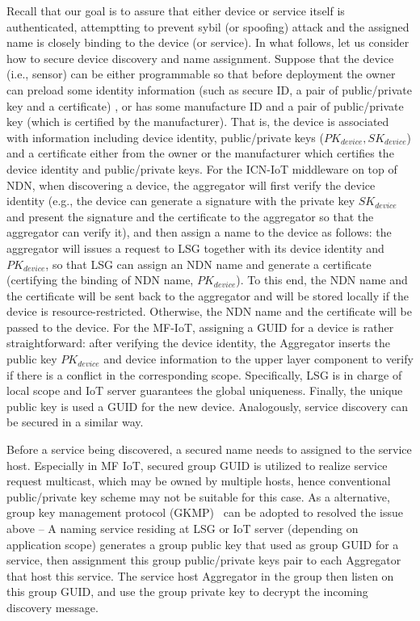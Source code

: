 Recall that our goal is to assure that either device or service itself is authenticated, attemptting to prevent sybil (or spoofing) attack \cite{sybil} and the assigned name is closely binding to the device (or service). In what follows, let us consider how to secure device discovery and name assignment. Suppose that the device (i.e., sensor) can be either programmable so that before deployment the owner can preload some identity information (such as secure ID, a pair of public/private key and a certificate) , or has some manufacture ID and a pair of public/private key (which is certified by the manufacturer). That is, the device is associated with information including device identity, public/private keys ($PK_{device}, SK_{device}$) and a certificate either from the owner or the manufacturer which certifies the device identity and public/private keys. For the ICN-IoT middleware on top of NDN, when discovering a device, the aggregator will first verify the device identity (e.g., the device can generate a signature with the private key $SK_{device}$ and present the signature and the certificate to the aggregator so that the aggregator can verify it), and then assign a name to the device as follows: the aggregator will issues a request to LSG together with its device identity and $PK_{device}$, so that LSG can assign an NDN name and generate a certificate (certifying the binding of NDN name, $PK_{device}$). To this end, the NDN name and the certificate will be sent back to the aggregator and will be stored locally if the device is resource-restricted. Otherwise, the NDN name and the certificate will be passed to the device. For the MF-IoT, assigning a GUID for a device is rather straightforward: after verifying the device identity, the Aggregator
inserts the public key $PK_{device}$ and device information to the upper layer component to verify if there is a conflict in the corresponding scope. Specifically, LSG is in charge of local scope and IoT server guarantees the global uniqueness. Finally, the unique public key is used a GUID for the new device. Analogously, service discovery can be secured in a similar way.

Before a service being discovered, a secured name needs to assigned to the service host. Especially in MF IoT, secured group GUID is utilized to realize service request multicast, which may be owned by multiple hosts, hence conventional public/private key scheme may not be suitable for this case. As a alternative, group key management protocol (GKMP)~\cite{harney1997group} can be adopted to resolved the issue above -- A naming service residing at LSG or IoT server (depending on application scope) generates a group public key that used as group GUID for a service, then assignment this group public/private keys pair to each Aggregator that host this service. The service host Aggregator in the group then listen on this group GUID, and use the group private key to decrypt the incoming discovery message.

